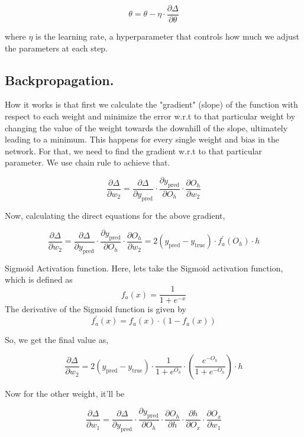 \documentclass[12pt]{article}
\begin{document}
\[
    \theta   = \theta   - \eta \cdot \frac{\partial \Delta}{\partial \theta}
\]

where \( \eta \) is the learning rate, a hyperparameter that controls how much we adjust the parameters at each step.

\subsection*{Backpropagation.}

How it works is that first we calculate the "gradient" (slope) of the function with respect to each weight and minimize the error w.r.t to that particular weight by changing the value of the weight towards the downhill of the slope, ultimately leading to a minimum. This happens for every single weight and bias in the network. For that, we need to find the gradient w.r.t to that particular parameter. We use chain rule to achieve that. 

\[
    \frac{\partial \Delta}{\partial w_2} = \frac{\partial \Delta }{\partial y_{\text{pred} } } \cdot  \frac{\partial y_{\text{pred} } }{\partial O_{h} } \cdot \frac{\partial O_{h}}{\partial w_2}
\]


Now, calculating the direct equations for the above gradient, 

\[
    \frac{\partial \Delta}{\partial w_2} = \frac{\partial \Delta }{\partial y_{\text{pred} } } \cdot  \frac{\partial y_{\text{pred} } }{\partial O_{h} } \cdot \frac{\partial O_{h}}{\partial w_2} = 2 (y_{\text{pred} } - y_{\text{true} }) \cdot f_{a} ^{\prime} (O_{h} ) \cdot h
\]

\vspace{0.1in}

\begin{questionn}{Sigmoid Activation function.}
    Here, lets take the Sigmoid activation function, which is defined as
    \[
    f_{a}(x) = \frac{1}{1 + e^{-x}}
    \]
    The derivative of the Sigmoid function is given by
    \[
    f_{a}^{\prime}(x) = f_{a}(x) \cdot (1 - f_{a}(x))
    \]
\end{questionn}

So, we get the final value as, 

\[
    \frac{\partial \Delta }{\partial w_2}  = 2 (y_{\text{pred}} - y_{\text{true} }) \cdot \frac{1}{1 + e^{O_{h} }} \cdot ( \frac{e^{-O_{h} } }{1 + e^{-O_{h} } }) \cdot h
\]

Now for the other weight, it'll be

\[
    \frac{\partial \Delta }{\partial w_1} = \frac{\partial \Delta }{\partial y_{\text{pred} } } \cdot  \frac{\partial y_{\text{pred} } }{\partial O_{h} } \cdot \frac{\partial O_{h}}{\partial h} \cdot \frac{\partial h}{\partial O_{x} } \cdot \frac{\partial O_{x}}{\partial w_1}
\]
\end{document}

